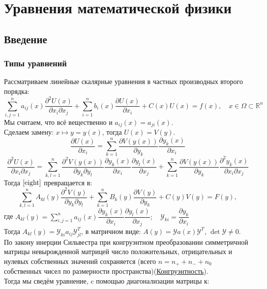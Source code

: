 \documentclass[11pt,a4paper]{report}
\numberwithin{equation}{section}
\numberwithin{figure}{chapter}
\numberwithin{table}{chapter}
\newcommand{\R}{\mathbb{R}}
\newcommand{\Y}{\mathscr{Y}}
\begin{document}
\chapter{Уравнения математической физики}

\section{Введение}
\subsection{Типы уравнений}
Рассматриваем линейные скалярные уравнения в частных производных второго порядка: 
\begin{equation}
\label{eight}
\sum\limits_{i,j=1}^{n}a_{ij}(x)\dfrac{\partial^2U(x)}{\partial x_i \partial x_j}+\sum\limits_{i=1}^{n}b_i(x)\dfrac{\partial U(x)}{\partial x_i}+C(x)U(x)=f(x), \quad x\in\Omega\subset\R^n
\end{equation}
Мы считаем, что всё вещественно и $a_{ij}(x)=a_{ji}(x)$. \\
Сделаем замену: $x\longmapsto y=y(x)$, тогда $U(x)=V(y)$.
\[\dfrac{\partial U(x)}{\partial x_i}=\sum\limits_{k=1}^{n}\dfrac{\partial V(y(x))}{\partial y_k}\dfrac{\partial y_k(x)}{\partial x_i}\]
\[\dfrac{\partial^2 U(x)}{\partial x_i\partial x_j}=\sum\limits_{k, l=1}^{n}\dfrac{\partial^2 V(y(x))}{\partial y_k\partial y_l}\dfrac{\partial y_k(x)}{\partial x_i}\dfrac{\partial y_l(x)}{\partial x_j}+\sum\limits_{k=1}^{n}\dfrac{\partial V(y(x))}{\partial y_k}\dfrac{\partial^2 y_k(x)}{\partial x_i\partial x_j}\]
Тогда $\ref{eight}$ превращается в:
\[\sum\limits_{k,l=1}^{n}A_{kl}(y)\dfrac{\partial^2V(y)}{\partial y_k \partial y_l}+\sum\limits_{k=1}^{n}B_k(y)\dfrac{\partial V(y)}{\partial y_k}+C(y)V(y)=F(y),\]
 где $A_{kl}(y)=\sum\limits_{i,j=1}^{n}a_{ij}(x)\dfrac{\partial y_k(x)}{\partial x_i}\dfrac{\partial y_l(x)}{\partial x_j}; \quad \Y_{ki}=\dfrac{\partial y_k}{\partial x_i}$ \\
Тогда $A_{kl}(y)=\Y_{ki}a_{ij}\Y^T_{jl}$, в матричном виде: $A(y)=\Y a(x)\Y^T$, $\det \Y\neq0$. \\
По закону инерции Сильвестра при конгруэнтном преобразовании симметричной матрицы невырожденной матрицей число положительных, отрицательных и нулевых собственных значений сохраняется (всего $n=n_+ +n_- +n_0$ собственных чисел по размерности пространства)(\href{https://en.wikipedia.org/wiki/Matrix_congruence}{Конгруэнтность}).\\Тогда мы сведём уравнение, c помощью диагонализации матрицы к:
\end{document}
